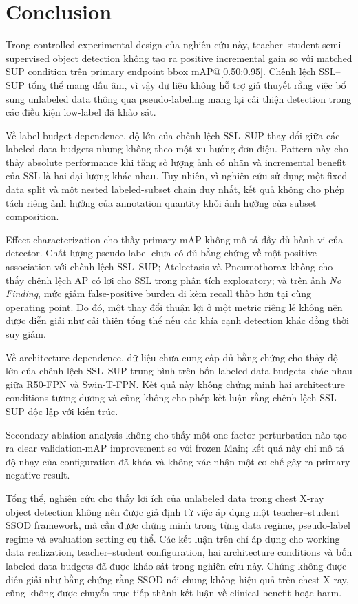 \documentclass[pdflatex,sn-mathphys-num]{sn-jnl}%
\theoremstyle{thmstyleone}%
\theoremstyle{thmstyletwo}%
\theoremstyle{thmstylethree}%
\begin{document}
\section{Conclusion}
\label{sec:conclusion}

Trong controlled experimental design của nghiên cứu này, teacher--student
semi-supervised object detection không tạo ra positive incremental gain
so với matched SUP condition trên primary endpoint
bbox mAP@[0.50:0.95]. Chênh lệch SSL--SUP tổng thể mang dấu âm, vì vậy dữ liệu không hỗ trợ giả thuyết rằng việc bổ sung unlabeled data thông qua pseudo-labeling mang lại cải thiện detection trong các điều kiện low-label đã khảo sát.

Về label-budget dependence, độ lớn của chênh lệch SSL--SUP thay đổi giữa các labeled-data budgets nhưng không theo một xu hướng đơn điệu. Pattern này cho thấy absolute performance khi tăng số lượng ảnh có nhãn và incremental benefit của SSL là hai đại lượng khác nhau. Tuy nhiên, vì nghiên cứu sử dụng một fixed data split và một nested labeled-subset chain duy nhất, kết quả không cho phép tách riêng ảnh hưởng của annotation quantity khỏi ảnh hưởng của subset composition.

Effect characterization cho thấy primary mAP không mô tả đầy đủ hành vi của detector. Chất lượng pseudo-label chưa có đủ bằng chứng về một positive association với chênh lệch SSL--SUP; Atelectasis và Pneumothorax không cho thấy chênh lệch AP có lợi cho SSL trong phân tích exploratory; và trên ảnh \textit{No Finding}, mức giảm false-positive burden đi kèm recall thấp hơn tại cùng operating point. Do đó, một thay đổi thuận lợi ở một metric riêng lẻ không nên được diễn giải như cải thiện tổng thể nếu các khía cạnh detection khác đồng thời suy giảm.

Về architecture dependence, dữ liệu chưa cung cấp đủ bằng chứng cho thấy độ lớn của chênh lệch SSL--SUP trung bình trên bốn labeled-data budgets khác nhau giữa R50-FPN và Swin-T-FPN. Kết quả này không chứng minh hai architecture conditions tương đương và cũng không cho phép kết luận rằng chênh lệch SSL--SUP độc lập với kiến trúc.

Secondary ablation analysis không cho thấy một one-factor perturbation nào tạo ra clear validation-mAP improvement so với frozen Main; kết quả này chỉ mô tả độ nhạy của configuration đã khóa và không xác nhận một cơ chế gây ra primary negative result.

Tổng thể, nghiên cứu cho thấy lợi ích của unlabeled data trong chest X-ray
object detection không nên được giả định từ việc áp dụng một teacher--student
SSOD framework, mà cần được chứng minh trong từng data regime, pseudo-label
regime và evaluation setting cụ thể. Các kết luận trên chỉ áp dụng cho working
data realization, teacher--student configuration, hai architecture conditions
và bốn labeled-data budgets đã được khảo sát trong nghiên cứu này. Chúng không
được diễn giải như bằng chứng rằng SSOD nói chung không hiệu quả trên chest
X-ray, cũng không được chuyển trực tiếp thành kết luận về clinical benefit
hoặc harm.
\end{document}
